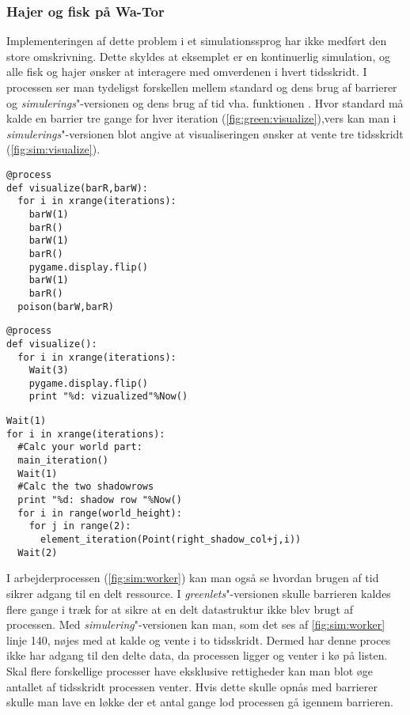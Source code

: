 \subsubsection{Hajer og fisk på Wa-Tor}
Implementeringen af dette problem  i et simulationssprog har ikke medført den store omskrivning. Dette skyldes at eksemplet er en kontinuerlig simulation, og alle fisk og hajer ønsker at interagere med omverdenen i hvert tidsskridt. I processen  ser man tydeligst forskellen mellem standard \pycsp og dens brug af barrierer og \emph{simulerings}"-versionen og dens brug af tid vha. funktionen . Hvor standard \pycsp må kalde en barrier tre gange for hver iteration (\cref{fig:green:visualize}),vers kan man i \emph{simulerings}"-versionen blot angive at visualiseringen ønsker at vente tre tidsskridt (\cref{fig:sim:visualize}). 

\begin{lstlisting}[firstnumber=157 ,float=hbtp, label=fig:green:visualize, caption=\code{Greenlets}"-versionen af visualize]
@process
def visualize(barR,barW):
  for i in xrange(iterations):
    barW(1)
    barR()
    barW(1)
    barR()
    pygame.display.flip()
    barW(1)
    barR()
  poison(barW,barR)     
\end{lstlisting}

\begin{lstlisting}[firstnumber=144 ,float=hbtp, label=fig:sim:visualize, caption=\code{simulerings}"-versionen af visualize]
@process
def visualize():
  for i in xrange(iterations):
    Wait(3)  
    pygame.display.flip()
    print "%d: vizualized"%Now()
\end{lstlisting}

\begin{lstlisting}[firstnumber=130 ,float=hbtp, label=fig:sim:worker, caption=Uddrag af arbejderprocessen i simulering]
Wait(1)
for i in xrange(iterations):
  #Calc your world part:
  main_iteration()
  Wait(1)
  #Calc the two shadowrows
  print "%d: shadow row "%Now()
  for i in range(world_height):
    for j in range(2):
      element_iteration(Point(right_shadow_col+j,i))
  Wait(2)
\end{lstlisting}

I arbejderprocessen (\cref{fig:sim:worker}) kan man også se hvordan brugen af tid  sikrer adgang til en delt ressource. I  \emph{greenlets}"-versionen skulle barrieren  kaldes flere gange i træk for at sikre at en delt datastruktur ikke blev brugt af processen. Med \emph{simulering}"-versionen kan man, som det ses af \cref{fig:sim:worker} linje 140, nøjes med at kalde  og vente i to tidsskridt. Dermed har denne proces ikke har adgang til den delte data, da processen  ligger og venter i kø på  listen. Skal flere forskellige processer have eksklusive rettigheder kan man blot øge antallet af tidsskridt processen venter. Hvis dette skulle opnås med barrierer skulle man lave en løkke der et antal gange lod processen gå igennem barrieren.

